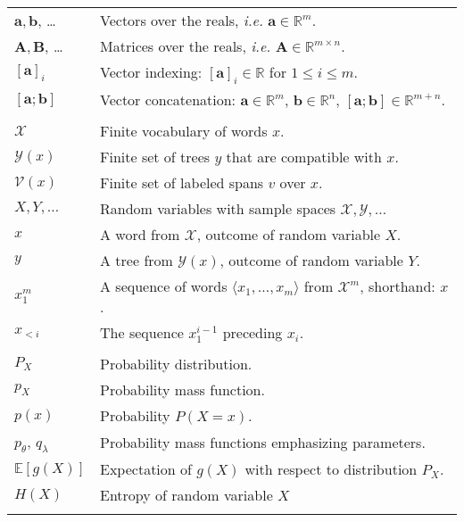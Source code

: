 %
% 

\begin{table}[h]
\center

  \begin{tabular}{ll}

    $\mathbf{a}, \mathbf{b}$, \dots  & Vectors over the reals, \textit{i.e.} $\mathbf{a} \in \mathbb{R}^m$.  \\
    $\mathbf{A}, \mathbf{B}$, \dots & Matrices over the reals, \textit{i.e.} $\mathbf{A} \in \mathbb{R}^{m \times n}$.   \\
    $[\mathbf{a}]_i$ & Vector indexing: $[\mathbf{a}]_i \in \mathbb{R}$ for $1 \leq i \leq m$. \\
    $[\mathbf{a}; \mathbf{b}]$ & Vector concatenation: $\mathbf{a} \in \mathbb{R}^{m}$, $\mathbf{b} \in \mathbb{R}^{n}$, $[\mathbf{a}; \mathbf{b}] \in \mathbb{R}^{m+n}$.  \\
    & \\

    $\mathcal{X}$ & Finite vocabulary of words $x$. \\
    $\mathcal{Y}(x)$ & Finite set of trees $y$ that are compatible with $x$.  \\
    $\mathcal{V}(x)$ & Finite set of labeled spans $v$ over $x$.  \\
    $X, Y, \dots$ & Random variables with sample spaces $\mathcal{X}, \mathcal{Y}, \dots$  \\
    $x$ & A word from $\mathcal{X}$, outcome of random variable $X$.   \\
    $y$ & A tree from $\mathcal{Y}(x)$, outcome of random variable $Y$.  \\
    $x_1^m$ & A sequence of words $\langle x_1, \dots, x_m \rangle$ from $\mathcal{X}^m$, shorthand: $x$. \\
    $x_{<i}$ & The sequence $x_{1}^{i-1}$ preceding $x_i$.  \\
    & \\

    $P_X$ & Probability distribution.  \\
    $p_{X}$ & Probability mass function. \\
    $p(x)$ & Probability $P(X = x)$. \\
    $p_{\theta}$, $q_{\lambda}$ & Probability mass functions emphasizing parameters.   \\
    $\mathbb{E}[g(X)]$ & Expectation of $g(X)$ with respect to distribution $P_X$.  \\
    $H(X)$ & Entropy of random variable $X$ \\
    & \\


\end{tabular}
\end{table}
